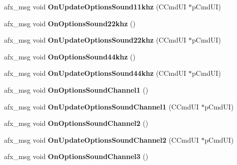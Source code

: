 \begin{DoxyCompactItemize}
\item 
\mbox{\label{class_main_wnd_a5b856fbd35deabdd0478f976efa1b00f}} 
afx\+\_\+msg void {\bfseries On\+Update\+Options\+Sound11khz} (C\+Cmd\+UI $\ast$p\+Cmd\+UI)
\item 
\mbox{\label{class_main_wnd_af0c7e1b51b3b500531bbef87b56b5fe7}} 
afx\+\_\+msg void {\bfseries On\+Options\+Sound22khz} ()
\item 
\mbox{\label{class_main_wnd_a46fd5386680b36338e706b9ca4e54694}} 
afx\+\_\+msg void {\bfseries On\+Update\+Options\+Sound22khz} (C\+Cmd\+UI $\ast$p\+Cmd\+UI)
\item 
\mbox{\label{class_main_wnd_a3045a6a1996566e65701d44a0db19a50}} 
afx\+\_\+msg void {\bfseries On\+Options\+Sound44khz} ()
\item 
\mbox{\label{class_main_wnd_addaa6cd2dcb4b919176fb2214e6def42}} 
afx\+\_\+msg void {\bfseries On\+Update\+Options\+Sound44khz} (C\+Cmd\+UI $\ast$p\+Cmd\+UI)
\item 
\mbox{\label{class_main_wnd_a6a21a6e3756553868f1792f371e7c468}} 
afx\+\_\+msg void {\bfseries On\+Options\+Sound\+Channel1} ()
\item 
\mbox{\label{class_main_wnd_a1609087341107ba7ef7ff37757cc307b}} 
afx\+\_\+msg void {\bfseries On\+Update\+Options\+Sound\+Channel1} (C\+Cmd\+UI $\ast$p\+Cmd\+UI)
\item 
\mbox{\label{class_main_wnd_a4f31de4544cb10e41968ccabfec95422}} 
afx\+\_\+msg void {\bfseries On\+Options\+Sound\+Channel2} ()
\item 
\mbox{\label{class_main_wnd_a23b93b9a81b78b2c0107df90b7df6510}} 
afx\+\_\+msg void {\bfseries On\+Update\+Options\+Sound\+Channel2} (C\+Cmd\+UI $\ast$p\+Cmd\+UI)
\item 
\mbox{\label{class_main_wnd_afa834c32c467c4c0e60aeea35034336b}} 
afx\+\_\+msg void {\bfseries On\+Options\+Sound\+Channel3} ()
\item 
\mbox{\label{class_main_wnd_a9dbf1190b86d5962ea43afb16fb48559}} 

\end{DoxyCompactItemize}
